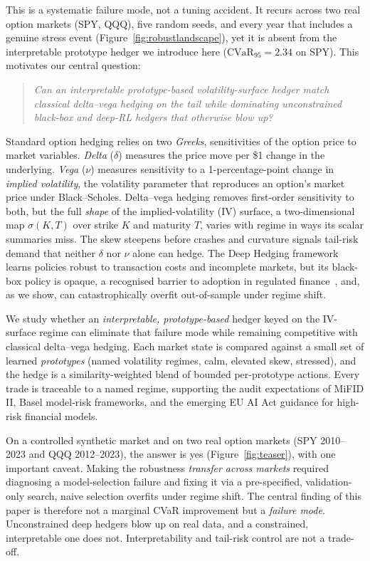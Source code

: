 \documentclass[sigconf,anonymous]{acmart}
\begin{document}
This is a systematic failure mode, not a tuning accident.  It recurs across two
real option markets (SPY, QQQ), five random seeds, and every year that includes
a genuine stress event (Figure~\ref{fig:robustlandscape}), yet it is absent from
the interpretable prototype hedger we introduce here ($\mathrm{CVaR}_{95}=2.34$ on SPY).
This motivates our central question:

\begin{quote}
\emph{Can an interpretable prototype-based volatility-surface hedger match
classical delta--vega hedging on the tail while dominating unconstrained black-box
and deep-RL hedgers that otherwise blow up?}
\end{quote}

Standard option hedging relies on two \emph{Greeks}, sensitivities of the option
price to market variables.  \emph{Delta} ($\delta$) measures the price move per \$1
change in the underlying. \emph{Vega} ($\nu$) measures sensitivity to a
1-percentage-point change in \emph{implied volatility}, the volatility parameter that
reproduces an option's market price under Black--Scholes. Delta--vega hedging
removes first-order sensitivity to both, but the full \emph{shape} of the
implied-volatility (IV) surface, a two-dimensional map $\sigma(K,T)$ over strike $K$
and maturity $T$, varies with regime in ways its scalar summaries miss. The skew
steepens before crashes and curvature signals tail-risk demand that neither
$\delta$ nor $\nu$ alone can hedge.  The Deep Hedging
framework~\cite{buehler2019deep} learns policies robust to transaction costs and
incomplete markets, but its black-box policy is opaque, a recognised barrier to
adoption in regulated finance~\cite{protohedge2025}, and, as we show, can
catastrophically overfit out-of-sample under regime shift.

We study whether an \emph{interpretable, prototype-based} hedger keyed on the
IV-surface regime can eliminate that failure mode while remaining competitive
with classical delta--vega hedging.  Each market state is compared against a
small set of learned \emph{prototypes} (named volatility regimes, calm, elevated
skew, stressed), and the hedge is a similarity-weighted blend of bounded
per-prototype actions.  Every trade is traceable to a named regime, supporting
the audit expectations of MiFID II, Basel model-risk frameworks, and the emerging
EU AI Act guidance for high-risk financial models.

On a controlled synthetic market and on two real option markets (SPY 2010--2023
and QQQ 2012--2023), the answer is yes (Figure~\ref{fig:teaser}), with one
important caveat. Making the robustness \emph{transfer across markets} required
diagnosing a model-selection failure and fixing it via a pre-specified,
validation-only search, naive selection overfits under regime shift. The central
finding of this paper is therefore not a marginal CVaR improvement but a
\emph{failure mode}. Unconstrained deep hedgers blow up on real data, and a
constrained, interpretable one does not. Interpretability and tail-risk control
are not a trade-off.
\end{document}
